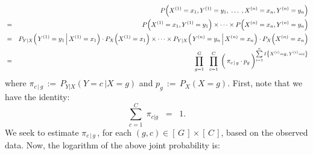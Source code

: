 \begin{eqnarray*}
&&
	P\!\left(X^{(1)} = x_{1},Y^{(1)}=y_{1}, \;\ldots\; ,X^{(n)} = x_{n},Y^{(n)}=y_{n}\right)
\\
&=&
	P\!\left(X^{(1)} = x_{1},Y^{(1)}=y_{1}\right) \times \cdots \times P\!\left(X^{(n)} = x_{n},Y^{(n)}=y_{n}\right)
\\
&=&
	P_{Y \vert X}\!\left(\left.Y^{(1)} = y_{1} \,\right\vert X^{(1)} = x_{1}\right) \cdot P_{X}\!\left(X^{(1)} = x_{1}\right)
	\times \cdots \times
	P_{Y \vert X}\!\left(\left.Y^{(n)} = y_{n} \,\right\vert X^{(n)} = x_{n}\right) \cdot P_{X}\!\left(X^{(n)} = x_{n}\right)
\\
&=&
	\overset{G}{\underset{g=1}{\prod}} \;\;\; \overset{C}{\underset{c=1}{\prod}} \;
	\left(\,\pi_{c\,\vert\,g} \overset{{\color{white}\vert}}{\cdot} p_{g}\,\right)
	^{\overset{n}{\underset{i=1}{\sum}}\,I\left\{X^{(i)}=g,\,Y^{(i)}=c\right\}}
\end{eqnarray*}
where
$\pi_{c\,\vert\,g} \,:=\, P_{Y \vert X}\!\left(\left.Y = c \,\right\vert X = g\right)$
and
$p_{g} \,:=\, P_{X}\!\left(X = g\right)$.
First, note that we have the identity:
\begin{equation*}
\overset{C}{\underset{c=1}{\sum}}\;\pi_{c\vert g} \;\; = \;\; 1.
\end{equation*}
We seek to estimate $\pi_{c\,\vert\,g}$\,,
for each $(g,c) \in \left[\,G\,\right] \times \left[\,C\,\right]$,
based on the observed data.
Now, the logarithm of the above joint probability is:
